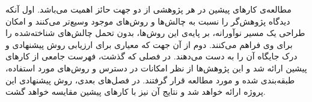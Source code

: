 

مطالعه‌ی کارهای پیشین در هر پژوهشی از دو جهت حائز اهمیت می‌باشد.
اول آنکه دیدگاه پژوهش‌گر را نسبت به چالش‌ها و روش‌های موجود وسیع‌تر می‌کنند و 
امکان طراحی یک مسیر نوآورانه، بر پایه‌ی این روش‌ها، بدون تحمل چالش‌های شناخته‌شده را برای وی فراهم می‌کنند.
دوم از آن جهت که معیاری برای ارزیابی روش پیشنهادی
و درک جایگاه آن را به دست می‌دهند.
در فصلی که گذشت، 
فهرست جامعی از کار‌های پیشین ارائه شد و این پژوهش‌ها از نظر امکانات در دسترس و روش‌های مورد استفاده، طبقه‌بندی شده و مورد مطالعه قرار گرفتند.
در فصل‌های بعدی، روش پیشنهادی این پروژه ارائه خواهد شد و نتایج آن نیز با کار‌های پیشین مقایسه خواهد گشت.